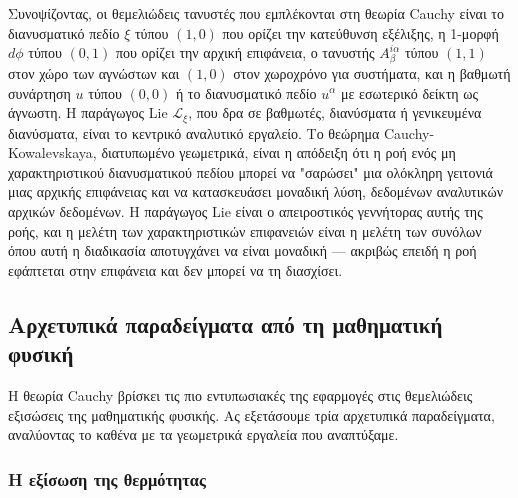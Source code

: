 \documentclass[12pt]{article}
\begin{document}
Συνοψίζοντας, οι θεμελιώδεις τανυστές που εμπλέκονται στη θεωρία Cauchy είναι το διανυσματικό πεδίο $\xi$ τύπου $(1,0)$ που ορίζει την κατεύθυνση εξέλιξης, η 1-μορφή $d\phi$ τύπου $(0,1)$ που ορίζει την αρχική επιφάνεια, ο τανυστής $A^{i \alpha}_\beta$ τύπου $(1,1)$ στον χώρο των αγνώστων και $(1,0)$ στον χωροχρόνο για συστήματα, και η βαθμωτή συνάρτηση $u$ τύπου $(0,0)$ ή το διανυσματικό πεδίο $u^\alpha$ με εσωτερικό δείκτη ως άγνωστη. Η παράγωγος Lie $\mathcal{L}_\xi$, που δρα σε βαθμωτές, διανύσματα ή γενικευμένα διανύσματα, είναι το κεντρικό αναλυτικό εργαλείο. Το θεώρημα Cauchy-Kowalevskaya, διατυπωμένο γεωμετρικά, είναι η απόδειξη ότι η ροή ενός μη χαρακτηριστικού διανυσματικού πεδίου μπορεί να "σαρώσει" μια ολόκληρη γειτονιά μιας αρχικής επιφάνειας και να κατασκευάσει μοναδική λύση, δεδομένων αναλυτικών αρχικών δεδομένων. Η παράγωγος Lie είναι ο απειροστικός γεννήτορας αυτής της ροής, και η μελέτη των χαρακτηριστικών επιφανειών είναι η μελέτη των συνόλων όπου αυτή η διαδικασία αποτυγχάνει να είναι μοναδική — ακριβώς επειδή η ροή εφάπτεται στην επιφάνεια και δεν μπορεί να τη διασχίσει.

\subsection{Αρχετυπικά παραδείγματα από τη μαθηματική φυσική}

Η θεωρία Cauchy βρίσκει τις πιο εντυπωσιακές της εφαρμογές στις θεμελιώδεις εξισώσεις της μαθηματικής φυσικής. Ας εξετάσουμε τρία αρχετυπικά παραδείγματα, αναλύοντας το καθένα με τα γεωμετρικά εργαλεία που αναπτύξαμε.

\subsubsection{Η εξίσωση της θερμότητας}
\end{document}
